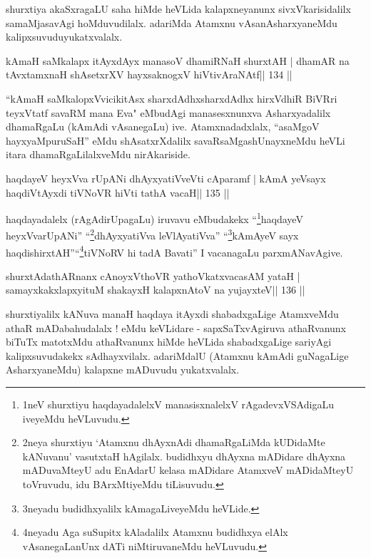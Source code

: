 \begin{artha}
shurxtiya akaSxragaLU saha hiMde heVLida kalapxneyanunx sivxVkarisidalilx samaMjasavAgi hoMduvudilalx. adariMda Atamxnu vAsanAsharxyaneMdu kalipxsuvudu\break yukatxvalalx.
\end{artha}

\begin{shl}
kAmaH saMkalapx itAyxdAyx manasoV dhamiRNaH shurxtAH |
dhamAR na tAvxtamxnaH shAsetxrXV hayxsaknogxV hiVtivAraNAtf\hfill || 134 ||
\end{shl}

\begin{artha}
``kAmaH saMkalopxVvicikitAsx sharxdAdhx\s sharxdAdhx hirxVdhiR BiVRri
  teyxVtatf savaRM mana Eva" eMbudAgi manasesxnunxva Asharxyadalilx
  dhamaRgaLu (kAmAdi vAsanegaLu) ive. Atamxnadadxlalx,
  ``asaMgoV hayxyaMpuruSaH'' eMdu shAsatxrXdalilx savaRsaMgashUnayxneMdu heVLi itara dhamaRgaLilalxveMdu nirAkariside.
\end{artha}

\begin{shl}
haqdayeV heyxVva rUpANi dhAyxyatiVveVti cAparamf |
kAmA yeV\s sayx haqdiVtAyxdi tiVNoVR hiVti tathA vacaH\hfill || 135 ||
\end{shl}

\begin{artha}
haqdayadalelx (rAgAdirUpagaLu) iruvavu
eMbudakekx ``\footnote{1neV shurxtiyu haqdayadalelxV manasisxnalelxV
  rAgadevxVSAdigaLu iveyeMdu heVLuvudu.}haqdayeV heyxVvarUpANi''
``\footnote{2neya shurxtiyu `Atamxnu dhAyxnAdi dhamaRgaLiMda
  kUDidaMte kANuvanu' vasutxtaH hAgilalx. budidhxyu dhAyxna mADidare
  dhAyxna mADuvaMteyU adu EnAdarU kelasa mADidare AtamxveV mADidaMteyU
  toVruvudu, idu BArxMtiyeMdu tiLisuvudu.}dhAyxyatiVva leVlAyatiVva''
``\footnote{3neyadu budidhxyalilx kAmagaLiveyeMdu heVLide.}kAmAyeV\s
sayx haqdishirxtAH''\break  ``\footnote{4neyadu Aga suSupitx kAladalilx
  Atamxnu budidhxya elAlx vAsanegaLanUnx dATi niMtiruvaneMdu 
  heVLuvudu.}tiVNoRV hi tadA Bavati'' I vacanagaLu
parxmANavAgive.
\end{artha}

\begin{shl}
shurxtAdathARnanx cAnoyxV\s thoVR yathoVkatxvacasAM yataH |
samayxkakxlapxyituM shakayxH kalapxnA\s toV na yujayxteV\hfill || 136 ||
\end{shl}

\begin{artha}
shurxtiyalilx kANuva manaH haqdaya itAyxdi shabadxgaLige AtamxveMdu athaR mADabahudalalx ! eMdu keVLidare - sapxSaTxvAgiruva athaRvanunx biTuTx matotxMdu athaRvanunx hiMde heVLida shabadxgaLige sariyAgi kalipxsuvudakekx sAdhayxvilalx. adariMdalU (Atamxnu kAmAdi guNagaLige AsharxyaneMdu) kalapxne mADuvudu yukatxvalalx.
\end{artha}

